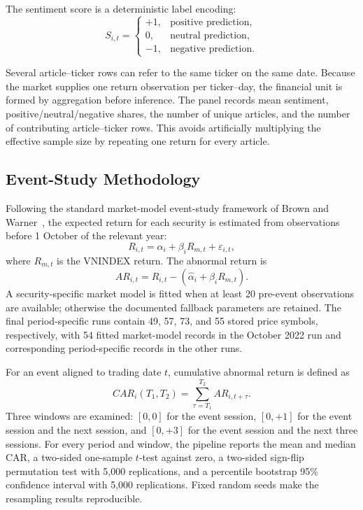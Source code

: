 The sentiment score is a deterministic label encoding:
\begin{equation}
 S_{i,t}=\begin{cases}
 +1,&\text{positive prediction},\\
 0,&\text{neutral prediction},\\
 -1,&\text{negative prediction}.
 \end{cases}
\end{equation}

Several article--ticker rows can refer to the same ticker on the same date. Because the market supplies one return observation per ticker--day, the financial unit is formed by aggregation before inference. The panel records mean sentiment, positive/neutral/negative shares, the number of unique articles, and the number of contributing article--ticker rows. This avoids artificially multiplying the effective sample size by repeating one return for every article.

\subsection{Event-Study Methodology}
\label{subsec:event-study-multi-year}

Following the standard market-model event-study framework of Brown and Warner~\cite{brownwarner1985}, the expected return for each security is estimated from observations before 1 October of the relevant year:
\begin{equation}
 R_{i,t}=\alpha_i+\beta_iR_{m,t}+\varepsilon_{i,t},
\end{equation}
where $R_{m,t}$ is the VNINDEX return. The abnormal return is
\begin{equation}
 AR_{i,t}=R_{i,t}-\left(\widehat{\alpha}_i+\widehat{\beta}_iR_{m,t}\right).
\end{equation}
A security-specific market model is fitted when at least 20 pre-event observations are available; otherwise the documented fallback parameters are retained. The final period-specific runs contain 49, 57, 73, and 55 stored price symbols, respectively, with 54 fitted market-model records in the October 2022 run and corresponding period-specific records in the other runs.

For an event aligned to trading date $t$, cumulative abnormal return is defined as
\begin{equation}
 CAR_i(T_1,T_2)=\sum_{\tau=T_1}^{T_2}AR_{i,t+\tau}.
\end{equation}
Three windows are examined: $[0,0]$ for the event session, $[0,+1]$ for the event session and the next session, and $[0,+3]$ for the event session and the next three sessions. For every period and window, the pipeline reports the mean and median CAR, a two-sided one-sample $t$-test against zero, a two-sided sign-flip permutation test with 5,000 replications, and a percentile bootstrap 95\% confidence interval with 5,000 replications. Fixed random seeds make the resampling results reproducible.


